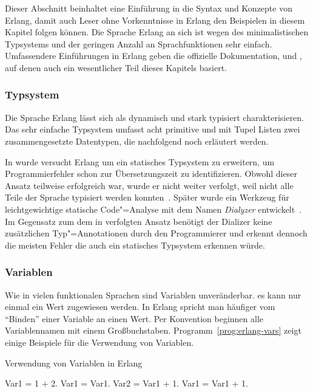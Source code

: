 Dieser Abschnitt beinhaltet eine Einführung in die Syntax und Konzepte von Erlang, damit auch Leser ohne Vorkenntnisse in Erlang den Beispielen in diesem Kapitel folgen können. Die Sprache Erlang an sich ist wegen des minimalistischen Typsystems und der geringen Anzahl an Sprachfunktionen sehr einfach. Umfassendere Einführungen in Erlang geben die offizielle Dokumentation, \cite{Hebert:2013:LYE:2543986} und \cite{armstrong03}, auf denen auch ein wesentlicher Teil dieses Kapitels basiert.

\subsubsection{Typsystem}
\label{subsubsec:erlang-typesystem}

Die Sprache Erlang lässt sich als dynamisch und stark typisiert charakterisieren. Das sehr einfache Typsystem umfasst acht primitive und mit Tupel \bzw Listen zwei zusammengesetzte Datentypen, die nachfolgend noch erläutert werden.

In \cite{Marlow:1997:PSS:258948.258962} wurde versucht Erlang um ein statisches Typsystem zu erweitern, um Programmierfehler schon zur Übersetzungszeit zu identifizieren. Obwohl dieser Ansatz teilweise erfolgreich war, wurde er nicht weiter verfolgt, weil nicht alle Teile der Sprache typisiert werden konnten~\cite[14]{Armstrong:2007:HE:1238844.1238850}. Später wurde ein Werkzeug für leichtgewichtige statische Code"=Analyse mit dem Namen \textit{Dialyzer} entwickelt~\cite{ErlangWarStory}. Im Gegensatz zum dem in \cite{Marlow:1997:PSS:258948.258962} verfolgten Ansatz benötigt der Dializer keine zusätzlichen Typ"=Annotationen durch den Programmierer und erkennt dennoch die meisten Fehler die auch ein statisches Typsystem erkennen würde.

\subsubsection{Variablen}

Wie in vielen funktionalen Sprachen sind Variablen unveränderbar. \Dah es kann nur einmal ein Wert zugewiesen werden. In Erlang spricht man häufiger vom "`Binden"' einer Variable an einen Wert. Per Konvention beginnen alle Variablennamen mit einem Großbuchstaben. Programm~\ref{prog:erlang-vars} zeigt einige Beispiele für die Verwendung von Variablen.

\begin{program}[!hbt]
\caption{Verwendung von Variablen in Erlang}
\label{prog:erlang-vars}
\begin{ErlangCode}
Var1 = 1 + 2.
Var1 = Var1. %
Var2 = Var1 + 1. %
Var1 = Var1 + 1. %
\end{ErlangCode}
\end{program}

